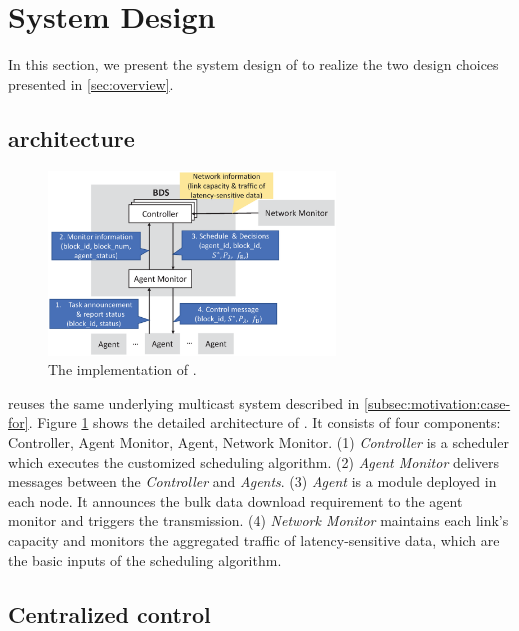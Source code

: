 \section{System Design}
\label{sec:system}

In this section, we present the system design of \name to realize the two design choices presented in \Section\ref{sec:overview}.

\subsection{\name architecture}
\label{subsec:system:architecture}

\begin{figure}[t]
  \centering
  \includegraphics[width=3in]{images/implementation_v2.eps}
  \caption{The implementation of \name.}
  \label{fig:implementation}
\end{figure}

\name reuses the same underlying multicast system described in \Section\ref{subsec:motivation:case-for}. Figure \ref{fig:implementation} shows the detailed architecture of \name. It consists of four components: Controller, Agent Monitor, Agent, Network Monitor. (1) \emph{Controller} is a scheduler which executes the customized scheduling algorithm. (2) \emph{Agent Monitor} delivers messages between the \emph{Controller} and \emph{Agents}. (3) \emph{Agent} is a module deployed in each node. It announces the bulk data download requirement to the agent monitor and triggers the transmission. (4) \emph{Network Monitor} maintains each link's capacity and monitors the aggregated traffic of latency-sensitive data, which are the basic inputs of the scheduling algorithm.

\subsection{Centralized control}
\label{subsec:system:centralized}

